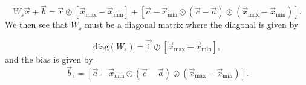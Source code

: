 \begin{equation}
 W_s\Vec{x} +\vec{b}= \Vec{x}\oslash\left[\Vec{x}_{\text{max}}-\Vec{x}_{\text{min}}\right] + \left[\Vec{a} - \Vec{x}_{\text{min}}\odot(\vec{c}-\vec{a})\oslash  (\Vec{x}_{\text{max}}-\Vec{x}_{\text{min}})\right].
\end{equation}
We then see that $W_s$ must be a diagonal matrix where the diagonal is given by 

\begin{equation}
\text{diag}(W_s)=\Vec{1}\oslash\left[\Vec{x}_{\text{max}}-\Vec{x}_{\text{min}}\right],
\end{equation}
and the bias is given by
\begin{equation}  
\Vec{b}_s=\left[\Vec{a} - \Vec{x}_{\text{min}}\odot(\vec{c}-\vec{a})\oslash  (\Vec{x}_{\text{max}}-\Vec{x}_{\text{min}})\right].
\end{equation}

